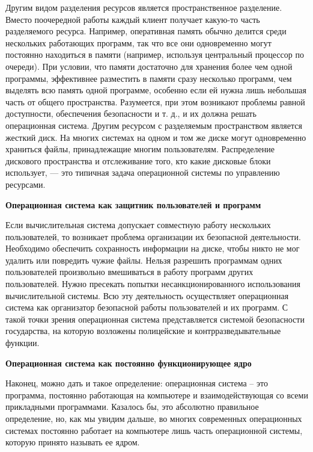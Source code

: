 Другим видом разделения ресурсов является пространственное разделение. Вместо поочередной работы каждый клиент получает какую-то часть разделяемого ресурса. Например, оперативная память обычно делится среди нескольких работающих программ, так что все они одновременно могут постоянно находиться в памяти (например, используя центральный процессор по очереди). При условии, что памяти достаточно для хранения более чем одной программы, эффективнее разместить в памяти сразу несколько программ, чем выделять всю память одной программе, особенно если ей нужна лишь небольшая часть от общего пространства. Разумеется, при этом возникают проблемы равной доступности, обеспечения безопасности и т. д., и их должна решать операционная система. Другим ресурсом с разделяемым пространством является жесткий диск. На многих системах на одном и том же диске могут одновременно храниться файлы, принадлежащие многим пользователям. Распределение дискового пространства и отслеживание того, кто какие дисковые блоки использует, — это типичная задача операционной системы по управлению ресурсами.

\begin{opr}\rm \hypertarget{opr3_OS}{\textbf{Операционная система как защитник пользователей и программ}}
\end{opr}
Если вычислительная система допускает совместную работу нескольких пользователей, то возникает проблема организации их безопасной деятельности. Необходимо обеспечить сохранность информации на диске, чтобы никто не мог удалить или повредить чужие файлы. Нельзя разрешить программам одних пользователей произвольно вмешиваться в работу программ других пользователей. Нужно пресекать попытки несанкционированного использования вычислительной системы. Всю эту деятельность осуществляет операционная система как организатор безопасной работы пользователей и их программ. С такой точки зрения операционная система представляется системой безопасности государства, на которую возложены полицейские и контрразведывательные функции.

\begin{opr}\rm \hypertarget{opr4_OS}{\textbf{Операционная система как постоянно функционирующее ядро}}
\end{opr}
Наконец, можно дать и такое определение: операционная система – это программа, постоянно работающая на компьютере и взаимодействующая со всеми прикладными программами. Казалось бы, это абсолютно правильное определение, но, как мы увидим дальше, во многих современных операционных системах постоянно работает на компьютере лишь часть операционной системы, которую принято называть ее ядром.

